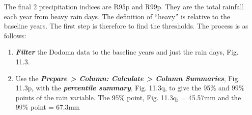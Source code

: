 \documentclass[
  letterpaper,
  DIV=11,
  numbers=noendperiod]{scrreprt}
\begin{document}
The final 2 precipitation indices are R95p and R99p. They are the total
rainfall each year from heavy rain days. The definition of ``heavy'' is
relative to the baseline years. The first step is therefore to find the
thresholds. The process is as follows:

\begin{enumerate}
\def\labelenumi{\arabic{enumi}.}
\item
  \textbf{\emph{Filter}} the Dodoma data to the baseline years and just
  the rain days, Fig. 11.3.
\item
  Use the \textbf{\emph{Prepare \textgreater{} Column: Calculate
  \textgreater{} Column Summaries}}, Fig. 11.3p, with the
  \textbf{\emph{percentile summary}}, Fig. 11.3q, to give the 95\% and
  99\% points of the rain variable. The 95\% point, Fig. 11.3q, =
  45.57mm and the 99\% point = 67.3mm
\end{enumerate}
\end{document}
